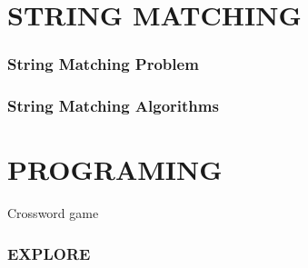 \documentclass[a4paper,11pt]{article}
\begin{document}
\part*{STRING MATCHING}
\section{String Matching Problem}
\section{String Matching Algorithms}

\part*{PROGRAMING}
    Crossword game

\setcounter{section}{0}
\section{EXPLORE}
\end{document}
